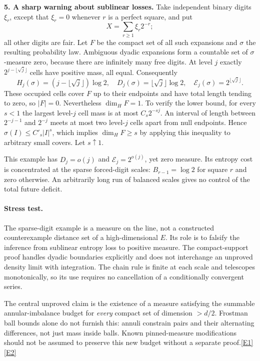 \documentclass[11pt,a4paper]{article}
\newcommand{\eref}[2]{\hyperlink{extra:#1:#2}{[E#2]}}
\begin{document}
\textbf{5. A sharp warning about sublinear losses.}
Take independent binary digits $\xi_r$, except that $\xi_r=0$ whenever
$r$ is a perfect square, and put
\[
 X=\sum_{r\ge1}\xi_r2^{-r};
\]
all other digits are fair. Let $F$ be the compact set of all such expansions
and $\sigma$ the resulting probability law. Ambiguous dyadic expansions
form a countable set of $\sigma$-measure zero, because there are infinitely
many free digits. At level $j$ exactly $2^{j-\lfloor\sqrt j\rfloor}$ cells
have positive mass, all equal. Consequently
\begin{equation}\label{30001063:sparse}
 H_j(\sigma)=(j-\lfloor\sqrt j\rfloor)\log2,
 \quad D_j(\sigma)=\lfloor\sqrt j\rfloor\log2,
 \quad \mathcal E_j(\sigma)=2^{\lfloor\sqrt j\rfloor}.
\end{equation}
These occupied cells cover $F$ up to their endpoints and have total length
tending to zero, so $|F|=0$. Nevertheless $\dim_H F=1$. To verify the lower
bound, for every $s<1$ the largest level-$j$ cell mass is at most
$C_s2^{-sj}$. An interval of length between $2^{-j-1}$ and $2^{-j}$ meets
at most two level-$j$ cells apart from null endpoints. Hence
$\sigma(I)\le C'_s|I|^s$, which implies $\dim_H F\ge s$ by applying this
inequality to arbitrary small covers. Let $s\uparrow1$.

This example has $D_j=o(j)$ and $\mathcal E_j=2^{o(j)}$, yet zero measure.
Its entropy cost is concentrated at the sparse forced-digit scales:
$B_{r-1}=\log2$ for square $r$ and zero otherwise. An arbitrarily long
run of balanced scales gives no control of the total future deficit.

\paragraph{Stress test.}
The sparse-digit example is a measure on the line, not a constructed
counterexample distance set of a high-dimensional $E$. Its role is to
falsify the inference from sublinear entropy loss to positive measure.
The compact-support proof handles dyadic boundaries explicitly and does
not interchange an unproved density limit with integration. The chain
rule is finite at each scale and telescopes monotonically, so its use
requires no cancellation of a conditionally convergent series.

The central unproved claim is the existence of a measure satisfying the
summable annular-imbalance budget for \emph{every} compact set of dimension
$>d/2$. Frostman ball bounds alone do not furnish this: annuli constrain
pairs and their alternating differences, not just mass inside balls.
Known pinned-measure modifications should not be assumed to preserve this
new budget without a separate proof.\eref{30001063}{1}\eref{30001063}{2}
\end{document}
